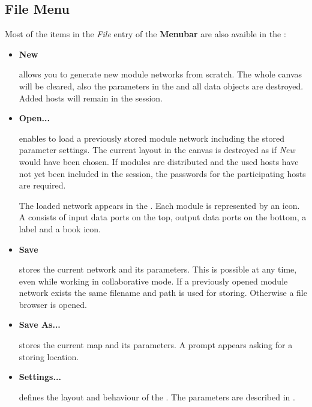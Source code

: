 	 
    
    
	 
	 \subsection{File Menu}
    \label{fileMenu}

	 Most of the items in the {\it File} entry of the {\bf Menubar} are also avaible in the \mytoolbar: 



	 \begin{itemize}
	 \item {\bf New} 
	 
	 allows you to generate new module networks from scratch. The whole canvas will be cleared,
	 also the parameters in the {\mycontrol} and all data objects are destroyed. 
	 Added hosts will remain in the session. 

	 \item {\bf Open...}  
	 
	 enables {\covise} to load a previously stored module network including the stored 
	 parameter settings. The current layout in the canvas is destroyed as if {\it New} would have been  
	 chosen. If modules are distributed and the used hosts have not yet been 
	 included in the session, the passwords for the participating hosts are required. 

	 The loaded network appears in the {\mycanvas}. Each module is represented by an icon. A \myicon 
	 consists of input data ports on the top, output data ports on the bottom, a label and a book icon.

	 \item {\bf Save} 

	 stores the current network and its parameters. This is possible at any time, even 
	 while working in collaborative mode. If a previously opened module network exists the same filename and 
    path is used for storing. Otherwise a file browser is opened.

	 \item {\bf Save As...} 

	 stores the current map and its parameters. A prompt appears asking for a storing location. 

	 \item {\bf Settings...} 

	 defines the layout and behaviour of the {\mapeditor}. The parameters are described in \mysetting.


\end{itemize}
